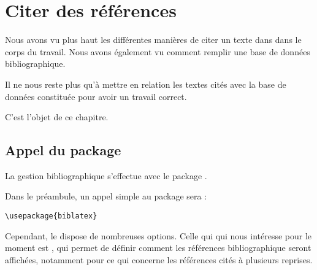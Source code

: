 \chapter{Citer des références}

\begin{prealable}
Nous avons vu plus haut les différentes manières de citer un texte dans  dans le corps du travail. Nous avons également vu comment remplir une base de données bibliographique.

Il ne nous reste plus qu'à mettre en relation les textes cités avec la base de données constituée pour avoir un travail correct.

C'est l'objet de ce chapitre.

\end{prealable}


\section[Appel du package]{Appel du package }

La gestion bibliographique s'effectue avec le package .

Dans le préambule, un appel simple au package sera :

\begin{verbatim}
\usepackage{biblatex}
\end{verbatim}

Cependant, le  dispose de nombreuses options. Celle qui qui nous intéresse pour le moment est , qui permet de définir comment les références bibliographique seront affichées, notamment pour ce qui concerne les références cités à plusieurs reprises.

